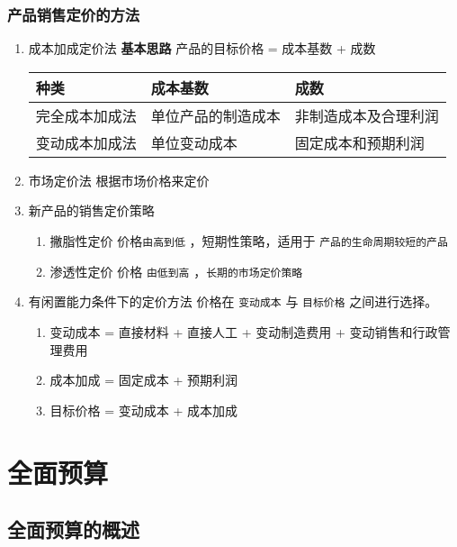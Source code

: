\documentclass[11pt]{article}
\begin{document}
\subsubsection{产品销售定价的方法}
\label{sec:org58e7b4c}
\begin{enumerate}
\item 成本加成定价法
\label{sec:orgca6025a}
\textbf{基本思路} 产品的目标价格 = 成本基数 + 成数
\begin{center}
\begin{tabular}{lll}
种类 & 成本基数 & 成数\\
\hline
完全成本加成法 & 单位产品的制造成本 & 非制造成本及合理利润\\
变动成本加成法 & 单位变动成本 & 固定成本和预期利润\\
\end{tabular}
\end{center}
\item 市场定价法
\label{sec:org70bb5cd}
根据市场价格来定价
\item 新产品的销售定价策略
\label{sec:org2635de3}
\begin{enumerate}
\item 撇脂性定价
\label{sec:org6249e7c}
价格\texttt{由高到低} ，短期性策略，适用于 \texttt{产品的生命周期较短的产品}
\item 渗透性定价
\label{sec:org9f9f990}
价格 \texttt{由低到高} ，\texttt{长期的市场定价策略}
\end{enumerate}
\item 有闲置能力条件下的定价方法
\label{sec:org823b1a8}
价格在 \texttt{变动成本} 与 \texttt{目标价格} 之间进行选择。
\begin{enumerate}
\item 变动成本 = 直接材料 + 直接人工 + 变动制造费用 + 变动销售和行政管理费用
\item 成本加成 = 固定成本 + 预期利润
\item 目标价格 = 变动成本 + 成本加成
\end{enumerate}
\end{enumerate}
\section{全面预算}
\label{sec:org9e1273e}
\subsection{全面预算的概述}
\label{sec:orgd581b77}
\end{document}
